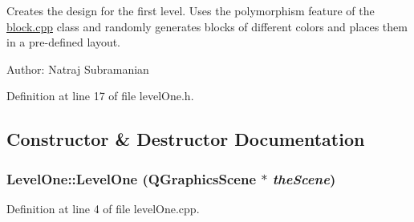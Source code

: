 Creates the design for the first level. Uses the polymorphism feature of the \hyperlink{block_8cpp}{block.cpp} class and randomly generates blocks of different colors and places them in a pre-\/defined layout.

Author: Natraj Subramanian 

Definition at line 17 of file levelOne.h.

\subsection{Constructor \& Destructor Documentation}
\hypertarget{class_level_one_a659fc1089dee490f34ebb490bd3db699}{
\subsubsection[{LevelOne}]{\setlength{\rightskip}{0pt plus 5cm}LevelOne::LevelOne (QGraphicsScene $\ast$ {\em theScene})}}
\label{class_level_one_a659fc1089dee490f34ebb490bd3db699}


Definition at line 4 of file levelOne.cpp.


